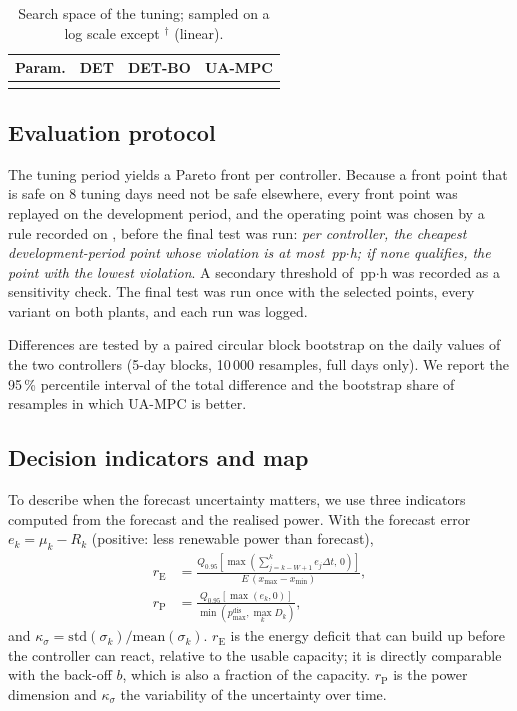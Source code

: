 \documentclass[a4paper,fleqn]{cas-dc}
\newcommand{\pph}{\,pp$\cdot$h\xspace}
\newcommand{\DET}{DET\xspace}
\newcommand{\DETBO}{DET-BO\xspace}
\newcommand{\UA}{UA-MPC\xspace}
\newcommand{\rE}{r_{\mathrm{E}}}
\newcommand{\rP}{r_{\mathrm{P}}}
\begin{document}
\begin{table}[t]
\caption{Search space of the tuning; sampled on a log scale except $^\dagger$ (linear).}\label{tab:space}
\small
\begin{tabular*}{\tblwidth}{@{}LLLL@{}}
\toprule
Param. & \DET & \DETBO & \UA \\
\midrule
{}
\bottomrule
\end{tabular*}
\end{table}

\subsection{Evaluation protocol}\label{sec:protocol}
The tuning period yields a Pareto front per controller. Because a front point that is safe on 8 tuning days need not be safe elsewhere, every front point was replayed on the development period, and the operating point was chosen by a rule recorded on \prereqDate, before the final test was run: \emph{per controller, the cheapest development-period point whose violation is at most \thrPrimary\pph; if none qualifies, the point with the lowest violation}. A secondary threshold of \thrSecondary\pph was recorded as a sensitivity check. The final test was run once with the selected points, every variant on both plants, and each run was logged.

Differences are tested by a paired circular block bootstrap \cite{kunsch1989jackknife,politis1992circular,lahiri2003resampling} on the daily values of the two controllers (5-day blocks, 10\,000 resamples, full days only). We report the 95\,\% percentile interval of the total difference and the bootstrap share of resamples in which \UA is better.

\subsection{Decision indicators and map}\label{sec:map}
To describe when the forecast uncertainty matters, we use three indicators computed from the forecast and the realised power. With the forecast error $e_k=\mu_k-R_k$ (positive: less renewable power than forecast),
\begin{align}
\rE&=\frac{Q_{0.95}\left[\max\left(\sum_{j=k-W+1}^{k}e_j\Delta t,\,0\right)\right]}{E\,(x_{\max}-x_{\min})},\label{eq:rE}\\
\rP&=\frac{Q_{0.95}\left[\max(e_k,0)\right]}{\min(p^{\mathrm{dis}}_{\max},\max_kD_k)},\label{eq:rP}
\end{align}
and $\kappa_\sigma=\mathrm{std}(\sigma_k)/\mathrm{mean}(\sigma_k)$. $\rE$ is the energy deficit that can build up before the controller can react, relative to the usable capacity; it is directly comparable with the back-off $b$, which is also a fraction of the capacity. $\rP$ is the power dimension and $\kappa_\sigma$ the variability of the uncertainty over time.
\end{document}
